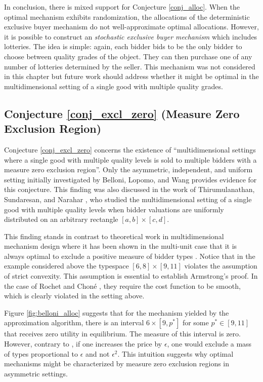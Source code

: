 In conclusion, there is mixed support for Conjecture \ref{conj_alloc}. When the optimal mechanism exhibits randomization, the allocations of the deterministic exclusive buyer mechanism do not well-approximate optimal allocations. However, it is possible to construct an \textit{stochastic exclusive buyer mechanism} which includes lotteries. The idea is simple: again, each bidder bids to be the only bidder to choose between quality grades of the object. They can then purchase one of any number of lotteries determined by the seller. This mechanism was not considered in this chapter but future work should address whether it might be optimal in the multidimensional setting of a single good with multiple quality grades.





\subsection{Conjecture \ref{conj_excl_zero} (Measure Zero Exclusion Region)}

Conjecture \ref{conj_excl_zero} concerns the existence of ``multidimensional settings where a single good with multiple quality levels is sold to multiple bidders with a measure zero exclusion region''. Only the asymmetric, independent, and uniform setting initially investigated by Belloni, Lopomo, and Wang \autocite*{belloni2010multidimensional} provides evidence for this conjecture. This finding was also discussed in the work of Thirumulanathan, Sundaresan, and Narahar \autocite*{thirumulanathan2019unitdemand}, who studied the multidimensional setting of a single good with multiple quality levels when bidder valuations are uniformly distributed on an arbitrary rectangle $[a,b] \times [c,d]$. 

This finding stands in contrast to theoretical work in multidimensional mechanism design where it has been shown in the multi-unit case that it is always optimal to exclude a positive measure of bidder types \autocite{armstrong1996multiproduct,rochet1998ironing}. Notice that in the example considered above the typespace $[6,8]\times[9,11]$ violates the assumption of strict convexity. This assumption is essential to establish Armstrong's \autocite*{armstrong1996multiproduct} proof. In the case of Rochet and Choné \autocite*{rochet1998ironing}, they require the cost function to be smooth, which is clearly violated in the setting above.

Figure \ref{fig:belloni_alloc} suggests that for the mechanism yielded by the approximation algorithm, there is an interval $6\times [9,p^*]$ for some $p^*\in [9,11]$ that receives zero utility in equilibrium. The measure of this interval is zero. However, contrary to \autocite[Proposition 1]{armstrong1996multiproduct}, if one increases the price by $\epsilon$, one would exclude a mass of types proportional to $\epsilon$ and not $\epsilon^2$. This intuition suggests why optimal mechanisms might be characterized by measure zero exclusion regions in asymmetric settings. 





